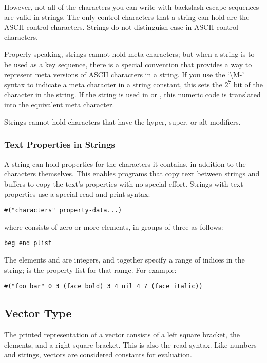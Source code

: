 However, not all of the characters you can write with backslash escape-sequences are valid in strings.
The only control characters that a string can hold are the ASCII control characters.
Strings do not distinguish case in ASCII control characters.

Properly speaking, strings cannot hold meta characters; but when a string is to be used as a key sequence, there is a special convention that provides a way to represent meta versions of ASCII characters in a string.
If you use the ‘\textbackslash{}M-’ syntax to indicate a meta character in a string constant, this sets the \(2^{7}\) bit of the character in the string.
If the string is used in  or , this numeric code is translated into the equivalent meta character.

Strings cannot hold characters that have the hyper, super, or alt modifiers.

\subsubsection{Text Properties in Strings}
\label{sec:text-prop-strings}

A string can hold properties for the characters it contains, in addition to the characters themselves.
This enables programs that copy text between strings and buffers to copy the text’s properties with no special effort.
Strings with text properties use a special read and print syntax:
\begin{lstlisting}
#("characters" property-data...)
\end{lstlisting}
where  consists of zero or more elements, in groups of three as follows:
\begin{lstlisting}
beg end plist
\end{lstlisting}
The elements  and  are integers, and together specify a range of indices in the string;  is the property list for that range.
For example:
\begin{lstlisting}
#("foo bar" 0 3 (face bold) 3 4 nil 4 7 (face italic))
\end{lstlisting}


\subsection{Vector Type}
\label{sec:vector-type}

The printed representation of a vector consists of a left square bracket, the elements, and a right square bracket.
This is also the read syntax.
Like numbers and strings, vectors are considered constants for evaluation.


